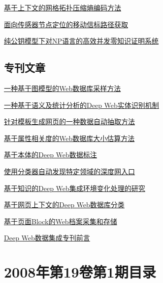 \documentclass[a4paper]{article}
\begin{document}
\href{http://www.jos.org.cn/ch/reader/download_pdf.aspx?file_no=20080224&year_id=2008&quarter_id=2&falg=1}{基于上下文的网格拓扑压缩熵编码方法}

\href{http://www.jos.org.cn/ch/reader/download_pdf.aspx?file_no=20080225&year_id=2008&quarter_id=2&falg=1}{面向传感器节点定位的移动信标路径获取}

\href{http://www.jos.org.cn/ch/reader/download_pdf.aspx?file_no=20080226&year_id=2008&quarter_id=2&falg=1}{纯公钥模型下对NP语言的高效并发零知识证明系统}

\subsection{专刊文章}
\href{http://www.jos.org.cn/ch/reader/download_pdf.aspx?file_no=20080202&year_id=2008&quarter_id=2&falg=1}{一种基于图模型的Web数据库采样方法}

\href{http://www.jos.org.cn/ch/reader/download_pdf.aspx?file_no=20080203&year_id=2008&quarter_id=2&falg=1}{一种基于语义及统计分析的Deep Web实体识别机制}

\href{http://www.jos.org.cn/ch/reader/download_pdf.aspx?file_no=20080204&year_id=2008&quarter_id=2&falg=1}{针对模板生成网页的一种数据自动抽取方法}

\href{http://www.jos.org.cn/ch/reader/download_pdf.aspx?file_no=20080205&year_id=2008&quarter_id=2&falg=1}{基于属性相关度的Web数据库大小估算方法}

\href{http://www.jos.org.cn/ch/reader/download_pdf.aspx?file_no=20080206&year_id=2008&quarter_id=2&falg=1}{基于本体的Deep Web数据标注}

\href{http://www.jos.org.cn/ch/reader/download_pdf.aspx?file_no=20080207&year_id=2008&quarter_id=2&falg=1}{使用分类器自动发现特定领域的深度网入口}

\href{http://www.jos.org.cn/ch/reader/download_pdf.aspx?file_no=20080208&year_id=2008&quarter_id=2&falg=1}{基于知识的Deep Web集成环境变化处理的研究}

\href{http://www.jos.org.cn/ch/reader/download_pdf.aspx?file_no=20080209&year_id=2008&quarter_id=2&falg=1}{基于网页上下文的Deep Web数据库分类}

\href{http://www.jos.org.cn/ch/reader/download_pdf.aspx?file_no=20080210&year_id=2008&quarter_id=2&falg=1}{基于页面Block的Web档案采集和存储}

\href{http://www.jos.org.cn/ch/reader/download_pdf.aspx?file_no=20080201&year_id=2008&quarter_id=2&falg=1}{Deep Web数据集成专刊前言}


\section{\textbf{2008年第19卷第1期目录}}
\end{document}
